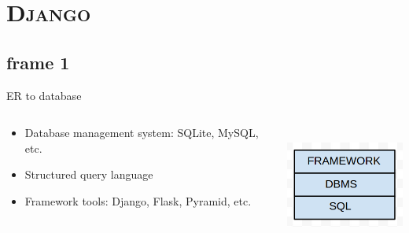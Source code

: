 \documentclass[xcolor=x11names,compress]{beamer}
\renewcommand{\(}{\begin{columns}}
\renewcommand{\)}{\end{columns}}
\newcommand{\<}[1]{\begin{column}{#1}}
\renewcommand{\>}{\end{column}}
\begin{document}
\section{\scshape Django}
\subsection{frame 1}
\begin{frame}{ER to database}
 \begin{columns}[T]
 \begin{column}{.5\textwidth}
  \begin{block}{}
    \begin{itemize}
     \item Database management system: SQLite, MySQL, etc.
     \item Structured query language
     \item Framework tools: Django, Flask, Pyramid, etc.
    \end{itemize}
  \end{block}
 \end{column}
 \begin{column}{.5\textwidth}
  \begin{block}{}
   \includegraphics[width=4cm, height=4cm]{images/layers.png}
  \end{block}
 \end{column}
\end{columns}

\end{frame}

\end{document}
